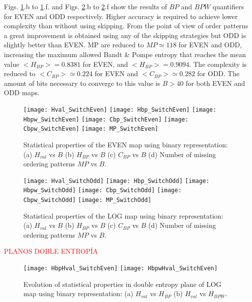 Figs. \ref{fig:EVEN_QuantiB}.b to \ref{fig:EVEN_QuantiB}.f. and Figs. \ref{fig:ODD_QuantiB}.b to \ref{fig:ODD_QuantiB}.f show the results of $BP$ and $BPW$ quantifiers for EVEN and ODD respectively.
Higher accuracy is required to achieve lower complexity than without using skipping.
From the point of view of order patterns a great improvement is obtained using any of the skipping strategies but ODD is slightly better than EVEN.
MP are reduced to $MP\simeq 118$ for EVEN and  ODD, increasing the maximum allowed Bandt \& Pompe entropy that reaches the mean value $<H_{BP}> = 0.8381$ for EVEN, and $<H_{BP}> = 0.9094$.
The complexity is reduced to $<C_{BP}>\simeq 0.224$ for EVEN and  $<C_{BP}>\simeq 0.282$ for ODD.
The amount of bits necessary to converge to this value is $B>40$ for both EVEN and ODD maps.

\begin{figure}
	\texttt{[image: Hval\_SwitchEven]}
	\texttt{[image: Hbp\_SwitchEven]}
	\texttt{[image: Hbpw\_SwitchEven]}
	\texttt{[image: Cbp\_SwitchEven]}
	\texttt{[image: Cbpw\_SwitchEven]}
	\texttt{[image: MP\_SwitchEven]}
	\caption{Statistical properties of the EVEN map using binary representation: (a) $H_{val}$ vs $B$ (b) $H_{BP}$ vs $B$ (c) $C_{BP}$ vs $B$ (d) Number of missing ordering patterns $MP$ vs $B$.}
	\label{fig:EVEN_QuantiB}
\end{figure}

\begin{figure}
	\texttt{[image: Hval\_SwitchOdd]}
	\texttt{[image: Hbp\_SwitchOdd]}
	\texttt{[image: Hbpw\_SwitchOdd]}
	\texttt{[image: Cbp\_SwitchOdd]}
	\texttt{[image: Cbpw\_SwitchOdd]}
	\texttt{[image: MP\_SwitchOdd]}
	\caption{Statistical properties of the LOG map using binary representation: (a) $H_{val}$ vs $B$ (b) $H_{BP}$ vs $B$ (c) $C_{BP}$ vs $B$ (d) Number of missing ordering patterns $MP$ vs $B$.}
	\label{fig:ODD_QuantiB}
	\end{figure}

\textcolor{red}{PLANOS DOBLE ENTROPÍA}

\begin{figure}
	\texttt{[image: HbpHval\_SwitchEven]}
	\texttt{[image: HbpwHval\_SwitchEven]}
	\caption{Evolution of statistical properties in double entropy plane of LOG map using binary representation: (a) $H_{val}$ vs $H_{BP}$ (b) $H_{val}$ vs $H_{BPW}$.}
	\label{fig:EVEN_HH}
\end{figure}

